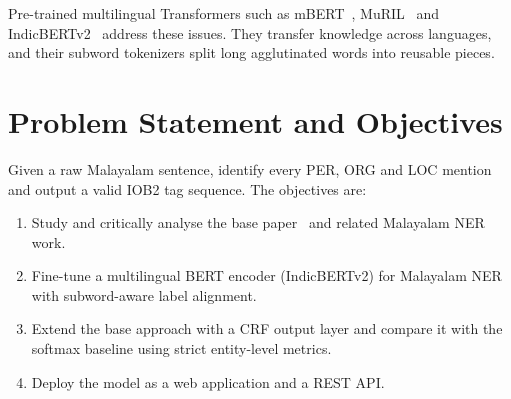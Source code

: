 Pre-trained multilingual Transformers such as mBERT~\cite{devlin2019bert},
MuRIL~\cite{khanuja2021muril} and IndicBERTv2~\cite{doddapaneni2023towards} address these issues. They transfer knowledge across
languages, and their subword tokenizers split long agglutinated words into
reusable pieces.

\section{Problem Statement and Objectives}

Given a raw Malayalam sentence, identify every PER, ORG and LOC mention and
output a valid IOB2 tag sequence. The objectives are:
\begin{enumerate}
  \item Study and critically analyse the base paper~\cite{mohan2023finetuned}
  and related Malayalam NER work.
  \item Fine-tune a multilingual BERT encoder (IndicBERTv2) for Malayalam NER
  with subword-aware label alignment.
  \item Extend the base approach with a CRF output layer and compare it with
  the softmax baseline using strict entity-level metrics.
  \item Deploy the model as a web application and a REST API.
\end{enumerate}
